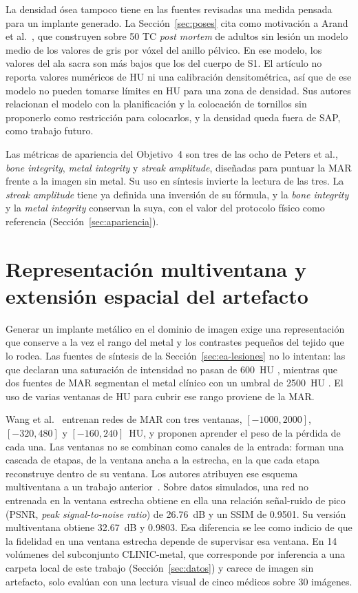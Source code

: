 La densidad ósea tampoco tiene en las fuentes revisadas una medida pensada para un implante generado. La Sección~\ref{sec:poses} cita como motivación a Arand et al.~\cite{arand2019pelvicring}, que construyen sobre 50 TC \emph{post mortem} de adultos sin lesión un modelo medio de los valores de gris por vóxel del anillo pélvico. En ese modelo, los valores del ala sacra son más bajos que los del cuerpo de S1. El artículo no reporta valores numéricos de HU ni una calibración densitométrica, así que de ese modelo no pueden tomarse límites en HU para una zona de densidad. Sus autores relacionan el modelo con la planificación y la colocación de tornillos sin proponerlo como restricción para colocarlos, y la densidad queda fuera de SAP, como trabajo futuro.

Las métricas de apariencia del Objetivo~4 son tres de las ocho de Peters et al., \emph{bone integrity}, \emph{metal integrity} y \emph{streak amplitude}, diseñadas para puntuar la MAR frente a la imagen sin metal. Su uso en síntesis invierte la lectura de las tres. La \emph{streak amplitude} tiene ya definida una inversión de su fórmula, y la \emph{bone integrity} y la \emph{metal integrity} conservan la suya, con el valor del protocolo físico como referencia (Sección~\ref{sec:apariencia}).

\section{Representación multiventana y extensión espacial del artefacto}\label{sec:ea-representacion}

Generar un implante metálico en el dominio de imagen exige una representación que conserve a la vez el rango del metal y los contrastes pequeños del tejido que lo rodea. Las fuentes de síntesis de la Sección~\ref{sec:ea-lesiones} no lo intentan: las que declaran una saturación de intensidad no pasan de 600~HU \cite{chen2024tumorsynthesis,hu2023,jin2021freetumor,wu2025freetumor}, mientras que dos fuentes de MAR segmentan el metal clínico con un umbral de 2500~HU \cite{wang2025adaptiveweighting,li2024}. El uso de varias ventanas de HU para cubrir ese rango proviene de la MAR.

Wang et al.~\cite{wang2025adaptiveweighting} entrenan redes de MAR con tres ventanas, $[-1000, 2000]$, $[-320, 480]$ y $[-160, 240]$~HU, y proponen aprender el peso de la pérdida de cada una. Las ventanas no se combinan como canales de la entrada: forman una cascada de etapas, de la ventana ancha a la estrecha, en la que cada etapa reconstruye dentro de su ventana. Los autores atribuyen ese esquema multiventana a un trabajo anterior~\cite{niu2021multiplewindow}. Sobre datos simulados, una red no entrenada en la ventana estrecha obtiene en ella una relación señal-ruido de pico (PSNR, \emph{peak signal-to-noise ratio}) de 26.76~dB y un SSIM de 0.9501. Su versión multiventana obtiene 32.67~dB y 0.9803. Esa diferencia se lee como indicio de que la fidelidad en una ventana estrecha depende de supervisar esa ventana. En 14 volúmenes del subconjunto CLINIC-metal, que corresponde por inferencia a una carpeta local de este trabajo (Sección~\ref{sec:datos}) y carece de imagen sin artefacto, solo evalúan con una lectura visual de cinco médicos sobre 30 imágenes.

